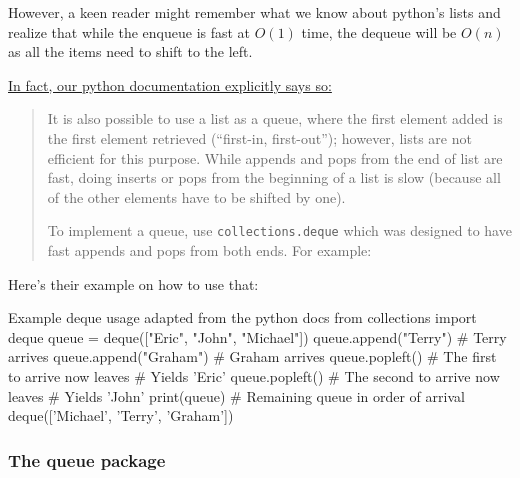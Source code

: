 However, a keen reader might remember what we know about python's lists and realize that while the enqueue is fast at $O(1)$ time, the dequeue will be $O(n)$ as all the items need to shift to the left.  

\href{https://docs.python.org/3/tutorial/datastructures.html#using-lists-as-queues}{In fact, our python documentation explicitly says so:}

\begin{quotation}
It is also possible to use a list as a queue, where the first element added is the first element retrieved (``first-in, first-out''); however, lists are not efficient for this purpose. While appends and pops from the end of list are fast, doing inserts or pops from the beginning of a list is slow (because all of the other elements have to be shifted by one).

To implement a queue, use \texttt{collections.deque} which was designed to have fast appends and pops from both ends. For example:
\end{quotation}


Here's their example on how to use that:
\begin{pycode}{Example deque usage adapted from the python docs}
from collections import deque
queue = deque(["Eric", "John", "Michael"])
queue.append("Terry")           # Terry arrives
queue.append("Graham")          # Graham arrives
queue.popleft()                 # The first to arrive now leaves
								# Yields 'Eric'
queue.popleft()                 # The second to arrive now leaves
                                # Yields 'John'
print(queue)                           # Remaining queue in order of arrival
deque(['Michael', 'Terry', 'Graham'])
\end{pycode}


\subsubsection{The queue package}
